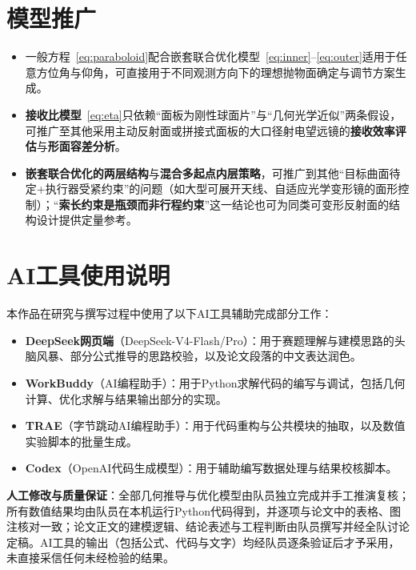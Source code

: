 \documentclass[withoutpreface]{cumcmthesis}
\begin{document}
\section{模型推广}

\begin{itemize}
\item 一般方程~\eqref{eq:paraboloid}配合嵌套联合优化模型~\eqref{eq:inner}--\eqref{eq:outer}适用于任意方位角与仰角，可直接用于不同观测方向下的理想抛物面确定与调节方案生成。

\item \textbf{接收比模型}~\eqref{eq:eta}只依赖``面板为刚性球面片''与``几何光学近似''两条假设，可推广至其他采用主动反射面或拼接式面板的大口径射电望远镜的\textbf{接收效率评估}与\textbf{形面容差分析}。

\item \textbf{嵌套联合优化的两层结构}与\textbf{混合多起点内层策略}，可推广到其他``目标曲面待定+执行器受紧约束''的问题（如大型可展开天线、自适应光学变形镜的面形控制）；``\textbf{索长约束是瓶颈而非行程约束}''这一结论也可为同类可变形反射面的结构设计提供定量参考。
\end{itemize}

\section{AI工具使用说明}

本作品在研究与撰写过程中使用了以下AI工具辅助完成部分工作：

\begin{itemize}
    \item \textbf{DeepSeek网页端}（DeepSeek-V4-Flash/Pro）：用于赛题理解与建模思路的头脑风暴、部分公式推导的思路校验，以及论文段落的中文表达润色。
    \item \textbf{WorkBuddy}（AI编程助手）：用于Python求解代码的编写与调试，包括几何计算、优化求解与结果输出部分的实现。
    \item \textbf{TRAE}（字节跳动AI编程助手）：用于代码重构与公共模块的抽取，以及数值实验脚本的批量生成。
    \item \textbf{Codex}（OpenAI代码生成模型）：用于辅助编写数据处理与结果校核脚本。
\end{itemize}

\textbf{人工修改与质量保证}：全部几何推导与优化模型由队员独立完成并手工推演复核；所有数值结果均由队员在本机运行Python代码得到，并逐项与论文中的表格、图注核对一致；论文正文的建模逻辑、结论表述与工程判断由队员撰写并经全队讨论定稿。AI工具的输出（包括公式、代码与文字）均经队员逐条验证后才予采用，未直接采信任何未经检验的结果。
\end{document}
